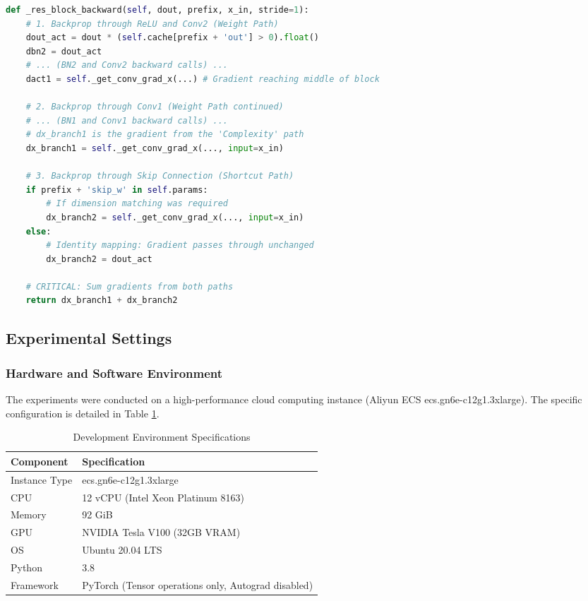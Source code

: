 \begin{lstlisting}[language=Python, caption={Complete Residual Block Backward Logic}, label={lst:res_full}]
def _res_block_backward(self, dout, prefix, x_in, stride=1):
    # 1. Backprop through ReLU and Conv2 (Weight Path)
    dout_act = dout * (self.cache[prefix + 'out'] > 0).float()
    dbn2 = dout_act
    # ... (BN2 and Conv2 backward calls) ...
    dact1 = self._get_conv_grad_x(...) # Gradient reaching middle of block
    
    # 2. Backprop through Conv1 (Weight Path continued)
    # ... (BN1 and Conv1 backward calls) ...
    # dx_branch1 is the gradient from the 'Complexity' path
    dx_branch1 = self._get_conv_grad_x(..., input=x_in)
    
    # 3. Backprop through Skip Connection (Shortcut Path)
    if prefix + 'skip_w' in self.params:
        # If dimension matching was required
        dx_branch2 = self._get_conv_grad_x(..., input=x_in)
    else:
        # Identity mapping: Gradient passes through unchanged
        dx_branch2 = dout_act
        
    # CRITICAL: Sum gradients from both paths
    return dx_branch1 + dx_branch2
\end{lstlisting}

\subsection{Experimental Settings}

\subsubsection{Hardware and Software Environment}
The experiments were conducted on a high-performance cloud computing instance (Aliyun ECS ecs.gn6e-c12g1.3xlarge). The specific configuration is detailed in Table \ref{tab:hardware}.
\begin{table}[htbp]
\centering
\caption{Development Environment Specifications}
\label{tab:hardware}
\begin{tabular}{ll}
\hline
\textbf{Component} & \textbf{Specification} \\
\hline
Instance Type & ecs.gn6e-c12g1.3xlarge \\
CPU & 12 vCPU (Intel Xeon Platinum 8163) \\
Memory & 92 GiB \\
GPU & NVIDIA Tesla V100 (32GB VRAM) \\
OS & Ubuntu 20.04 LTS \\
Python & 3.8 \\
Framework & PyTorch (Tensor operations only, Autograd disabled) \\
\hline
\end{tabular}
\end{table}

